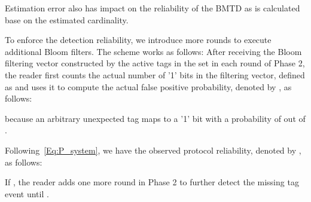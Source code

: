 \documentclass[10pt, twocolumn]{IEEEtran}
\begin{document}
Estimation error also has impact on the reliability of the BMTD as  is calculated base on the estimated cardinality.


To enforce the detection reliability, we introduce more rounds to execute additional Bloom filters. The scheme works as follows: After receiving the Bloom filtering vector constructed by the active tags in the set  in each round of Phase 2, the reader first counts the actual number of '1' bits in the filtering vector, defined as  and uses it to compute the actual false positive probability, denoted by , as follows:

because an arbitrary unexpected tag maps to a '1' bit with a probability of  out of .

Following~\eqref{Eq:P_system}, we have the observed protocol reliability, denoted by , as follows:

If , the reader adds one more round in Phase 2 to further detect the missing tag event until .
\end{document}
